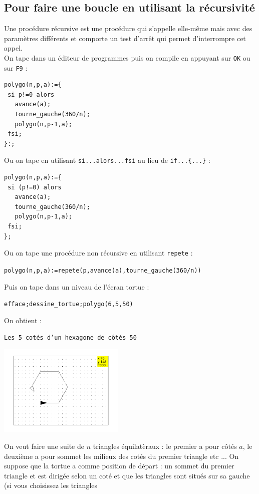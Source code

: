 \documentclass[a4paper,11pt]{book}
\begin{document}
\subsection{Pour faire une boucle en utilisant la r\'ecursivit\'e}
Une proc\'edure r\'ecursive est une proc\'edure qui s'appelle elle-m\^eme mais
avec des param\`etres diff\'erents et comporte un test d'arr\^et qui permet 
d'interrompre cet appel.\\
On tape dans un \'editeur de programmes puis on compile en appuyant sur {\tt OK}
ou sur {\tt F9} :
\begin{verbatim} 
polygo(n,p,a):={
 si p!=0 alors
   avance(a);
   tourne_gauche(360/n);
   polygo(n,p-1,a);
 fsi;
}:;
\end{verbatim}
Ou on tape en utilisant {\tt si...alors...fsi} au lieu de {\tt if...\{...\}} :
\begin{verbatim} 
polygo(n,p,a):={
 si (p!=0) alors
   avance(a);
   tourne_gauche(360/n);
   polygo(n,p-1,a);
 fsi;
};
\end{verbatim}
Ou on tape une proc\'edure non r\'ecursive en utilisant {\tt repete} :
\begin{center}{\tt polygo(n,p,a):=repete(p,avance(a),tourne\_gauche(360/n))}\end{center}
Puis on tape dans un niveau de l'\'ecran tortue :
\begin{center}{\tt efface;dessine\_tortue;polygo(6,5,50)}\end{center}
On obtient :
\begin{center}{\tt Les 5 cot\'es d'un hexagone de c\^ot\'es 50}\end{center}
\begin{center}\includegraphics[width=6cm]{tortueh}\end{center}
On veut faire une suite de $n$ triangles \'equilat\`eraux : le premier a pour 
c\^ot\'es $a$, le deuxi\`eme a pour sommet les milieux des cot\'es du premier 
triangle etc ...
On suppose que la tortue a comme position de d\'epart :
un sommet du premier triangle et est dirig\'ee selon un cot\'e et que 
les triangles sont situ\'es sur sa gauche (si vous choisissez les triangles 
\end{document}
